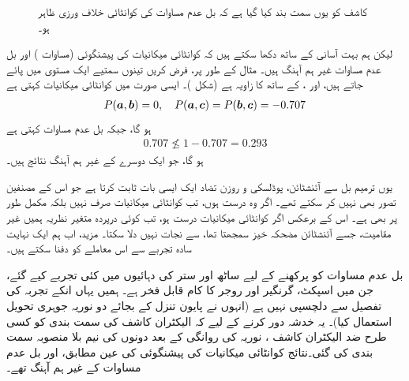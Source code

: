 \begin{figure}
\centering
{}
\caption{کاشف کو یوں سمت بند کیا گیا ہے کہ بل عدم مساوات کی کوانٹائی خلاف ورزی ظاہر ہو۔}
\label{شکل_بکھراو_بل_عدم_مساوات}
\end{figure}

لیکن ہم بہت آسانی کے ساتھ دکھا سکتے ہیں کہ کوانٹائی میکانیات کی پیشنگوئی (مساوات ) اور بل عدم مساوات غیر ہم آہنگ ہیں۔ مثال کے طور پر، فرض کریں تینوں سمتیے ایک مستوی میں پائے جاتے ہیں، اور ،  کے ساتھ  کا زاویہ  ہے (شکل )۔ ایسی صورت میں کوانٹائی میکانیات کہتی ہے 
\begin{align*}
	P({{\boldsymbol{a}}}, {{\boldsymbol{b}}}) = 0,\quad P({{\boldsymbol{a}}}, {{\boldsymbol{c}}}) = P({{\boldsymbol{b}}}, {{\boldsymbol{c}}}) =\num{-0.707}
\end{align*}
ہو گا، جبکہ بل عدم مساوات کہتی ہے 
\begin{align*}
	\num{0.707}\nleq 1-\num{0.707} = \num{0.293}
\end{align*}
ہو گا، جو ایک دوسرے کے غیر ہم آہنگ نتائج ہیں۔

 یوں ترمیم بل سے آئنشٹائن، پوڈلسکی و روزن تضاد ایک ایسی بات ثابت کرتا ہے جو اس کے مصنفین تصور بھی نہیں کر سکتے تھے۔ اگر وہ درست ہوں، تب کوانٹائی میکانیات صرف  نہیں بلکہ مکمل طور پر  بھی ہے۔ اس کے برعکس اگر کوانٹائی میکانیات درست ہو، تب کوئی درپردہ متغیر نظریہ ہمیں غیر مقامیت، جسے آئنشٹائن مضحکہ خیز سمجھتا تھا، سے نجات نہیں دلا سکتا۔ مزید، اب ہم ایک نہایت سادہ تجربے سے اس معاملے کو دفنا سکتے ہیں۔

بل عدم مساوات کو پرکھنے کے لیے ساٹھ اور ستر کی دہائیوں میں کئی تجربے کیے گئے، جن میں اسپکٹ، گرنگیر اور روجر کا کام قابل فخر ہے۔ ہمیں یہاں انکے تجربہ کی تفصیل سے دلچسپی نہیں ہے (انہوں نے پایون تنزل کے بجائے دو نوریہ جوہری تحویل استعمال کیا)۔ یہ خدشہ دور کرنے کے لیے کہ الیکٹران کاشف کی سمت بندی کو کسی طرح ضد الیکٹران کاشف ، نوریہ کی روانگی کے بعد دونوں کی نیم بلا منصوبہ سمت بندی کی گئی۔نتائج کوانٹائی میکانیات کی پیشنگوئی کی عین مطابق، اور بل عدم مساوات کے غیر ہم آہنگ تھے۔


